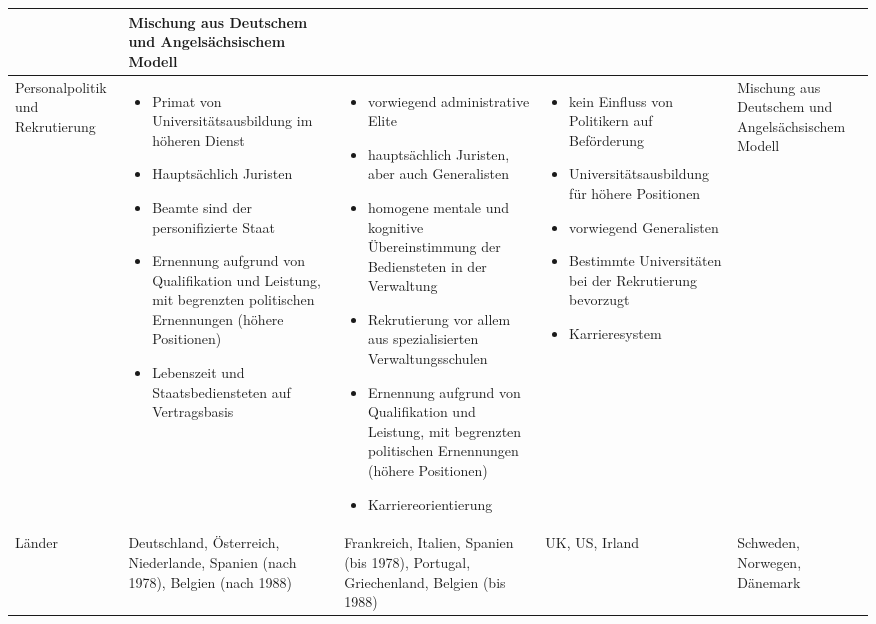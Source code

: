 \begin{landscape}
\begin{scriptsize}
\begin{longtable}[H]{|L{4cm}|L{5cm}|L{5cm}|L{5cm}|L{5cm}|}
&	Mischung aus Deutschem und Angelsächsischem Modell\\\hline
Personalpolitik und Rekrutierung&
\begin{itemize}
\item Primat von Universitätsausbildung im höheren Dienst
\item Hauptsächlich Juristen
\item Beamte sind der personifizierte Staat
\item Ernennung aufgrund von Qualifikation und Leistung, mit begrenzten politischen Ernennungen (höhere Positionen)
\item Lebenszeit und Staatsbediensteten auf Vertragsbasis	
\end{itemize}&
 \vspace{-2mm}
\begin{itemize}
\item vorwiegend administrative Elite
\item hauptsächlich Juristen, aber auch Generalisten
\item homogene mentale und kognitive Übereinstimmung der Bediensteten in der Verwaltung                             \item Rekrutierung vor allem aus spezialisierten Verwaltungsschulen
\item Ernennung aufgrund von Qualifikation und Leistung, mit begrenzten politischen Ernennungen (höhere Positionen)
\item Karriereorientierung
 \vspace{-2mm}
\end{itemize}
&
\begin{itemize}
\item kein Einfluss von Politikern auf Beförderung
\item Universitätsausbildung für höhere Positionen
\item  vorwiegend Generalisten
\item Bestimmte Universitäten bei der Rekrutierung bevorzugt
\item Karrieresystem
\end{itemize}&	Mischung aus Deutschem und Angelsächsischem Modell\\\hline
Länder&	Deutschland, Österreich, Niederlande, Spanien (nach 1978), Belgien (nach 1988)&	Frankreich, Italien, Spanien (bis 1978), Portugal, Griechenland, Belgien (bis 1988) 	&UK, US, Irland&	Schweden, Norwegen, Dänemark\\\hline

\end{longtable}	
\end{scriptsize}
\end{landscape}	
